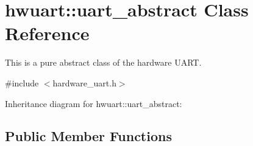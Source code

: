 \hypertarget{classhwuart_1_1uart__abstract}{}\section{hwuart\+:\+:uart\+\_\+abstract Class Reference}
\label{classhwuart_1_1uart__abstract}


This is a pure abstract class of the hardware U\+A\+RT.  




{\ttfamily \#include $<$hardware\+\_\+uart.\+h$>$}



Inheritance diagram for hwuart\+:\+:uart\+\_\+abstract\+:
\subsection*{Public Member Functions}
